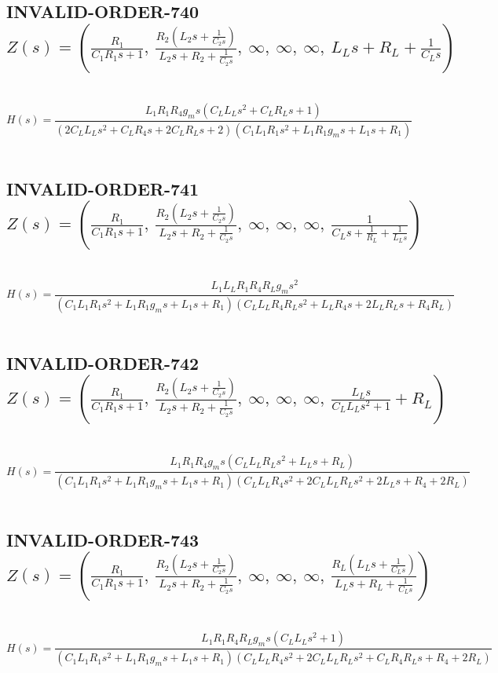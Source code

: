 \documentclass{article}
\begin{document}
\subsection{INVALID-ORDER-740 $Z(s) = \left( \frac{R_{1}}{C_{1} R_{1} s + 1}, \  \frac{R_{2} \left(L_{2} s + \frac{1}{C_{2} s}\right)}{L_{2} s + R_{2} + \frac{1}{C_{2} s}}, \  \infty, \  \infty, \  \infty, \  L_{L} s + R_{L} + \frac{1}{C_{L} s}\right)$ } \ 
\textbf{\[H(s) = \frac{L_{1} R_{1} R_{4} g_{m} s \left(C_{L} L_{L} s^{2} + C_{L} R_{L} s + 1\right)}{\left(2 C_{L} L_{L} s^{2} + C_{L} R_{4} s + 2 C_{L} R_{L} s + 2\right) \left(C_{1} L_{1} R_{1} s^{2} + L_{1} R_{1} g_{m} s + L_{1} s + R_{1}\right)}\] } \ 
\subsection{INVALID-ORDER-741 $Z(s) = \left( \frac{R_{1}}{C_{1} R_{1} s + 1}, \  \frac{R_{2} \left(L_{2} s + \frac{1}{C_{2} s}\right)}{L_{2} s + R_{2} + \frac{1}{C_{2} s}}, \  \infty, \  \infty, \  \infty, \  \frac{1}{C_{L} s + \frac{1}{R_{L}} + \frac{1}{L_{L} s}}\right)$ } \ 
\textbf{\[H(s) = \frac{L_{1} L_{L} R_{1} R_{4} R_{L} g_{m} s^{2}}{\left(C_{1} L_{1} R_{1} s^{2} + L_{1} R_{1} g_{m} s + L_{1} s + R_{1}\right) \left(C_{L} L_{L} R_{4} R_{L} s^{2} + L_{L} R_{4} s + 2 L_{L} R_{L} s + R_{4} R_{L}\right)}\] } \ 
\subsection{INVALID-ORDER-742 $Z(s) = \left( \frac{R_{1}}{C_{1} R_{1} s + 1}, \  \frac{R_{2} \left(L_{2} s + \frac{1}{C_{2} s}\right)}{L_{2} s + R_{2} + \frac{1}{C_{2} s}}, \  \infty, \  \infty, \  \infty, \  \frac{L_{L} s}{C_{L} L_{L} s^{2} + 1} + R_{L}\right)$ } \ 
\textbf{\[H(s) = \frac{L_{1} R_{1} R_{4} g_{m} s \left(C_{L} L_{L} R_{L} s^{2} + L_{L} s + R_{L}\right)}{\left(C_{1} L_{1} R_{1} s^{2} + L_{1} R_{1} g_{m} s + L_{1} s + R_{1}\right) \left(C_{L} L_{L} R_{4} s^{2} + 2 C_{L} L_{L} R_{L} s^{2} + 2 L_{L} s + R_{4} + 2 R_{L}\right)}\] } \ 
\subsection{INVALID-ORDER-743 $Z(s) = \left( \frac{R_{1}}{C_{1} R_{1} s + 1}, \  \frac{R_{2} \left(L_{2} s + \frac{1}{C_{2} s}\right)}{L_{2} s + R_{2} + \frac{1}{C_{2} s}}, \  \infty, \  \infty, \  \infty, \  \frac{R_{L} \left(L_{L} s + \frac{1}{C_{L} s}\right)}{L_{L} s + R_{L} + \frac{1}{C_{L} s}}\right)$ } \ 
\textbf{\[H(s) = \frac{L_{1} R_{1} R_{4} R_{L} g_{m} s \left(C_{L} L_{L} s^{2} + 1\right)}{\left(C_{1} L_{1} R_{1} s^{2} + L_{1} R_{1} g_{m} s + L_{1} s + R_{1}\right) \left(C_{L} L_{L} R_{4} s^{2} + 2 C_{L} L_{L} R_{L} s^{2} + C_{L} R_{4} R_{L} s + R_{4} + 2 R_{L}\right)}\] } \ 
\end{document}
